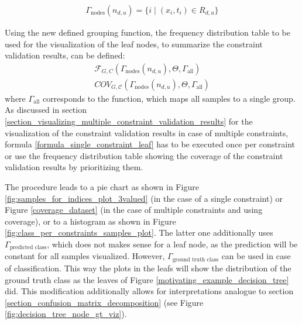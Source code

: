 \begin{gather}
    \Gamma_\text{nodes}(n_{d,u}) = \{i \mid (x_i,t_i) \in R_{d,u}\}
\end{gather}

Using the new defined grouping function, the frequency distribution table to be used for the visualization of the leaf nodes, to summarize the constraint validation results, can be defined:
\begin{gather}
    \mathcal{F}_{G,C}(\Gamma_\text{nodes}(n_{d,u}),\Theta, \Gamma_\text{all}) \label{formula_single_constraint_leaf}\\
    COV_{G,\mathcal{C}}(\Gamma_\text{nodes}(n_{d,u}),\Theta,\Gamma_\text{all}) \label{formula_multiple_constraints_leaf}
\end{gather}
where $\Gamma_\text{all}$ corresponds to the function, which maps all samples to a single group.
As discussed in section \ref{section_visualizing_multiple_constraint_validation_results} for the visualization of the constraint validation results in case of multiple constraints, formula \ref{formula_single_constraint_leaf} has to be executed once per constraint or use the frequency distribution table showing the \glqq coverage\grqq{} of the constraint validation results by prioritizing them.

The procedure leads to a pie chart as shown in Figure \ref{fig:samples_for_indices_plot_3valued} (in the case of a single constraint) or Figure \ref{coverage_dataset} (in the case of multiple constraints and using coverage), or to a histogram as shown in Figure \ref{fig:class_per_constraints_samples_plot}. The latter one additionally uses $\Gamma_\text{predicted class}$, which does not makes sense for a leaf node, as the prediction will be constant for all samples visualized. However, $\Gamma_\text{ground truth class}$ can be used in case of classification. This way the plots in the leafs will show the distribution of the ground truth class as the leaves of Figure \ref{motivating_example_decision_tree} did. This modification additionally allows for interpretations analogue to section \ref{section_confusion_matrix_decomposition} (see Figure \ref{fig:decision_tree_node_gt_viz}). 

